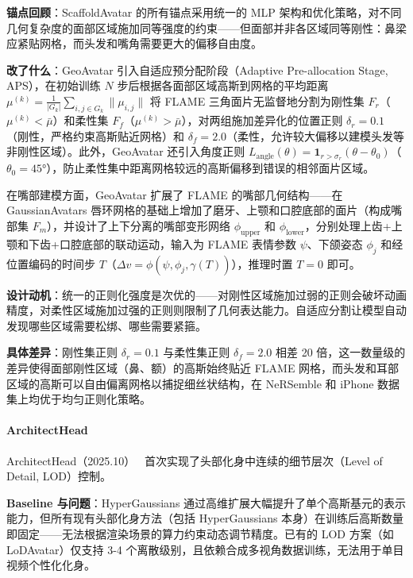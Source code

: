 \textbf{锚点回顾}：ScaffoldAvatar 的所有锚点采用统一的 MLP 架构和优化策略，对不同几何复杂度的面部区域施加同等强度的约束——但面部并非各区域同等刚性：鼻梁应紧贴网格，而头发和嘴角需要更大的偏移自由度。

\textbf{改了什么}：GeoAvatar 引入自适应预分配阶段（Adaptive Pre-allocation Stage, APS），在初始训练 $N$ 步后根据各面部区域高斯到网格的平均距离 $\mu^{(k)} = \frac{1}{|G_k|} \sum_{i,j \in G_k} \| \mu_{i,j} \|$ 将 FLAME 三角面片无监督地分割为刚性集 $F_r$（$\mu^{(k)} < \bar\mu$）和柔性集 $F_f$（$\mu^{(k)} > \bar\mu$），对两组施加差异化的位置正则 $\delta_r=0.1$（刚性，严格约束高斯贴近网格）和 $\delta_f=2.0$（柔性，允许较大偏移以建模头发等非刚性区域）。此外，GeoAvatar 还引入角度正则 $L_{\text{angle}}(\theta) = \mathbf{1}_{r > \sigma_r}(\theta - \theta_0)$（$\theta_0 = 45°$），防止柔性集中距离网格较远的高斯偏移到错误的相邻面片区域。

在嘴部建模方面，GeoAvatar 扩展了 FLAME 的嘴部几何结构——在 GaussianAvatars 唇环网格的基础上增加了磨牙、上颚和口腔底部的面片（构成嘴部集 $F_m$），并设计了上下分离的嘴部变形网络 $\phi_{\text{upper}}$ 和 $\phi_{\text{lower}}$，分别处理上齿+上颚和下齿+口腔底部的联动运动，输入为 FLAME 表情参数 $\psi$、下颌姿态 $\phi_j$ 和经位置编码的时间步 $T$（$\Delta v = \phi(\psi, \phi_j, \gamma(T))$），推理时置 $T=0$ 即可。

\textbf{设计动机}：统一的正则化强度是次优的——对刚性区域施加过弱的正则会破坏动画精度，对柔性区域施加过强的正则则限制了几何表达能力。自适应分割让模型自动发现哪些区域需要松绑、哪些需要紧箍。

\textbf{具体差异}：刚性集正则 $\delta_r=0.1$ 与柔性集正则 $\delta_f=2.0$ 相差 20 倍，这一数量级的差异使得面部刚性区域（鼻、额）的高斯始终贴近 FLAME 网格，而头发和耳部区域的高斯可以自由偏离网格以捕捉细丝状结构，在 NeRSemble 和 iPhone 数据集上均优于均匀正则化策略。

\paragraph{ArchitectHead}

ArchitectHead（2025.10）~\cite{2510_05488} 首次实现了头部化身中连续的细节层次（Level of Detail, LOD）控制。

\textbf{Baseline 与问题}：HyperGaussians 通过高维扩展大幅提升了单个高斯基元的表示能力，但所有现有头部化身方法（包括 HyperGaussians 本身）在训练后高斯数量即固定——无法根据渲染场景的算力约束动态调节精度。已有的 LOD 方案（如 LoDAvatar）仅支持 3-4 个离散级别，且依赖合成多视角数据训练，无法用于单目视频个性化化身。

